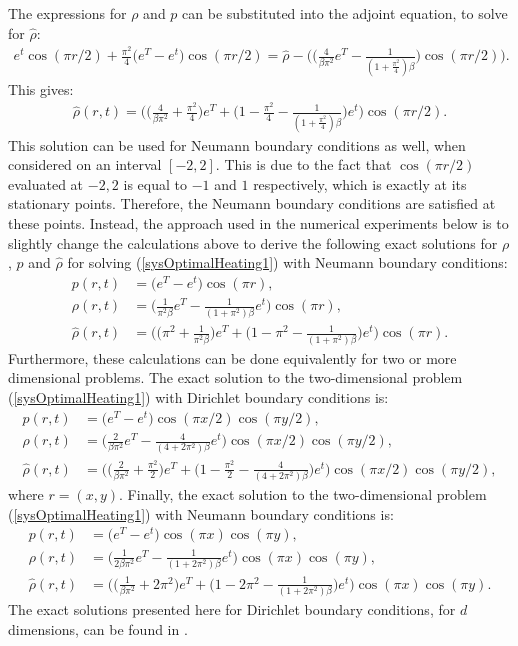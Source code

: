 The expressions for $\rho$ and $p$ can be substituted into the adjoint equation, to solve for $\hat \rho$:
\begin{align*}
e^t \cos(\pi r/2) + \frac{\pi^2}{4}\bigg( e^T -e^t \bigg) \cos(\pi r /2) = \hat \rho - \bigg(\bigg(\frac{4}{\beta \pi^2}e^T -\frac{1}{(1+\frac{\pi^2}{4}) \beta}\bigg)\cos(\pi r /2) \bigg).
\end{align*}
This gives:
\begin{align*}
\hat \rho(r,t)=\bigg( \bigg( \frac{4}{\beta \pi^2}+ \frac{\pi^2}{4} \bigg) e^T + \bigg(1- \frac{\pi^2}{4}  -\frac{1}{(1+\frac{\pi^2}{4}) \beta} \bigg) e^t\bigg)  \cos(\pi r /2) .
\end{align*}
This solution can be used for Neumann boundary conditions as well, when considered on an interval $[-2,2]$. This is due to the fact that $\cos(\pi r/2)$ evaluated at $-2,2$ is equal to $-1$ and $1$ respectively, which is exactly at its stationary points. Therefore, the Neumann boundary conditions are satisfied at these points.
Instead, the approach used in the numerical experiments below is to slightly change the calculations above to derive the following exact solutions for $\rho$, $p$ and $\hat \rho$ for solving (\ref{sysOptimalHeating1}) with Neumann boundary conditions:
\begin{align*}
p(r,t) &=\bigg( e^T -e^t \bigg) \cos(\pi r),\\
\rho(r,t) &= \bigg( \frac{1}{\pi^2 \beta}e^T - \frac{1}{(1+\pi^2)\beta}e^t\bigg)\cos(\pi r),\\
\hat \rho(r,t) &= \bigg( \bigg(\pi^2 + \frac{1}{\pi^2 \beta}\bigg)e^T + \bigg( 1- \pi^2 - \frac{1}{(1+\pi^2)\beta}\bigg)e^t \bigg) \cos(\pi r).
\end{align*}
Furthermore, these calculations can be done equivalently for two or more dimensional problems. 
The exact solution to the two-dimensional problem (\ref{sysOptimalHeating1}) with Dirichlet boundary conditions is:
\begin{align*}
p(r,t) &= \bigg( e^T -e^t \bigg) \cos(\pi x /2)\cos(\pi y /2),\\
\rho(r,t) &= \bigg(\frac{2}{\beta \pi^2}e^T -\frac{4}{(4+2\pi^2) \beta}e^t\bigg)\cos(\pi x /2)\cos(\pi y /2),\\
\hat \rho (r,t) &=\bigg( \bigg( \frac{2}{\beta \pi^2}+ \frac{\pi^2}{2} \bigg) e^T + \bigg(1- \frac{\pi^2}{2}  -\frac{4}{(4+2\pi^2) \beta} \bigg) e^t\bigg)  \cos(\pi x /2)\cos(\pi y /2),
\end{align*}
where $r=(x,y)$.
Finally, the exact solution to the two-dimensional problem (\ref{sysOptimalHeating1}) with Neumann boundary conditions is:
\begin{align*}
p(r,t)&= \bigg( e^T -e^t \bigg) \cos(\pi x )\cos(\pi y),\\
\rho(r,t) &= \bigg(\frac{1}{2\beta \pi^2}e^T -\frac{1}{(1+2\pi^2) \beta}e^t\bigg)\cos(\pi x )\cos(\pi y ),\\
\hat \rho (r,t) &=\bigg( \bigg( \frac{1}{\beta \pi^2}+ 2\pi^2 \bigg) e^T + \bigg(1- 2\pi^2  -\frac{1}{(1+2\pi^2) \beta} \bigg) e^t\bigg)  \cos(\pi x)\cos(\pi y).
\end{align*}
The exact solutions presented here for Dirichlet boundary conditions, for $d$ dimensions, can be found in \cite{GuettelPearson1}.
